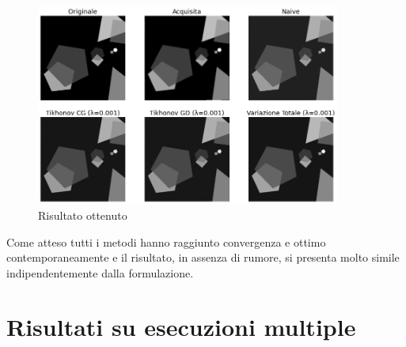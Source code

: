 \documentclass[11pt]{article}
\begin{document}
\begin{figure}[H]
    \centering
    \includegraphics[width=10cm]{semiconvergenza/3/deblur_all.png}
    \caption{Risultato ottenuto}
    \label{fig:semiconv_deblur3}
\end{figure}
Come atteso tutti i metodi hanno raggiunto convergenza e ottimo contemporaneamente e il risultato, in assenza di rumore, si presenta molto simile indipendentemente dalla formulazione.

\section{Risultati su esecuzioni multiple}



\end{document}
